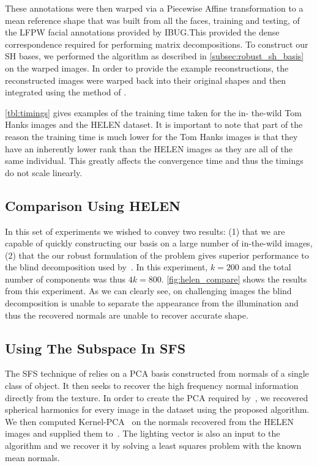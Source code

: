 These annotations were then warped via a Piecewise Affine transformation to a
mean reference shape that was built from all the faces, training and testing, of
the LFPW facial annotations provided by IBUG.\@ This provided the dense
correspondence required for performing matrix decompositions. To construct our
SH bases, we performed the algorithm as described in
\cref{subsec:robust_sh_basis} on the warped images. In order to provide
the example reconstructions, the reconstructed images were warped back into
their original shapes and then integrated using the method of 
\citet{RefWorks:99}.

\cref{tbl:timings} gives examples of the training time taken for the in-
the-wild Tom Hanks images and the HELEN dataset. It is important to note that
part of the reason the training time is much lower for the Tom Hanks images is
that they have an inherently lower rank than the HELEN images as they are all of
the same individual. This greatly affects the convergence time and thus the
timings do not scale linearly.
\subsection{Comparison Using HELEN}\label{subsec:experiments_helen}
In this set of experiments we wished to convey two results: (1) that we are
capable of quickly constructing our basis on a large number of in-the-wild
images, (2) that the our robust formulation of the problem gives superior
performance to the blind decomposition used by~\cite{RefWorks:311}. In this
experiment, $k = 200$ and the total number of components was thus $4k = 800$.
\cref{fig:helen_compare} shows the results from this experiment. As we can
clearly see, on challenging images the blind decomposition is unable to separate
the appearance from the illumination and thus the recovered normals are unable
to recover accurate shape.
\subsection{Using The Subspace In SFS}\label{subsec:experiments_smith}
The SFS technique of \citet{RefWorks:90} relies on a PCA basis
constructed from normals of a single class of object. It then seeks to recover
the high frequency normal information directly from the texture. In order to
create the PCA required by~\cite{RefWorks:90}, we recovered spherical harmonics
for every image in the dataset using the proposed algorithm. We then computed
Kernel-PCA~\cite{Snape:2014de} on the normals recovered from the HELEN images
and supplied them to~\cite{RefWorks:90}. The lighting vector is also an input to
the algorithm and we recover it by solving a least squares problem with the
known mean normals.

